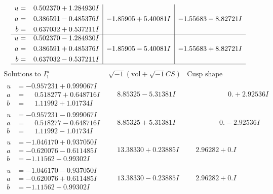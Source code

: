 \documentclass[1p]{elsarticle_modified}
\theoremstyle{definition}
\newcommand{\I}{\sqrt{-1}}
\begin{document}
$$\begin{array}{c|c|c}
\begin{aligned}
u &= \phantom{-}0.502370 + 1.284930 I \\
a &= \phantom{-}0.386591 - 0.485376 I \\
b &= \phantom{-}0.637032 + 0.537211 I\end{aligned}
 & -1.85905 + 5.40081 I & -1.55683 - 8.82721 I \\ \hline\begin{aligned}
u &= \phantom{-}0.502370 - 1.284930 I \\
a &= \phantom{-}0.386591 + 0.485376 I \\
b &= \phantom{-}0.637032 - 0.537211 I\end{aligned}
 & -1.85905 - 5.40081 I & -1.55683 + 8.82721 I\\
 \hline 
 \end{array}$$\newpage$$\begin{array}{c|c|c}  
\text{Solutions to }I^u_{1}& \I (\text{vol} + \sqrt{-1}CS) & \text{Cusp shape}\\
 \hline 
\begin{aligned}
u &= -0.957231 + 0.999067 I \\
a &= \phantom{-}0.518277 + 0.648716 I \\
b &= \phantom{-}1.11992 + 1.01734 I\end{aligned}
 & \phantom{-}8.85325 - 5.31381 I & \phantom{-0.000000 -}0. + 2.92536 I \\ \hline\begin{aligned}
u &= -0.957231 - 0.999067 I \\
a &= \phantom{-}0.518277 - 0.648716 I \\
b &= \phantom{-}1.11992 - 1.01734 I\end{aligned}
 & \phantom{-}8.85325 + 5.31381 I & \phantom{-0.000000 } 0. - 2.92536 I \\ \hline\begin{aligned}
u &= -1.046170 + 0.937050 I \\
a &= -0.620076 - 0.611485 I \\
b &= -1.11562 - 0.99302 I\end{aligned}
 & \phantom{-}13.38330 + 0.23885 I & \phantom{-}2.96282 + 0. I\phantom{ +0.000000I} \\ \hline\begin{aligned}
u &= -1.046170 - 0.937050 I \\
a &= -0.620076 + 0.611485 I \\
b &= -1.11562 + 0.99302 I\end{aligned}
 & \phantom{-}13.38330 - 0.23885 I & \phantom{-}2.96282 + 0. I\phantom{ +0.000000I} \\ \hline\begin{aligned}

\end{aligned}
\end{array}$$
\end{document}
